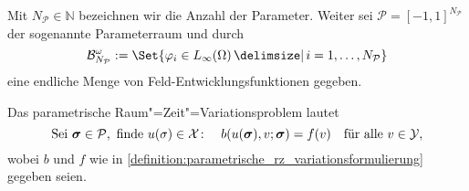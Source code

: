 \documentclass[../main.tex]{subfiles}
\begin{document}
\begin{Bemerkung}
    Mit $N_{\mathcal P} \in \mathbb{N}$ bezeichnen wir die Anzahl der Parameter.
    Weiter sei $\mathcal P = [-1, 1]^{N_{\mathcal P}}$ der sogenannte Parameterraum und durch
    \begin{equation}
        \mathcal B^{\omega}_{N_{\mathcal P}} := \Set{ \varphi_{i} \in L_{\infty}(\Omega) \given i = 1, \dots, N_{\mathcal P}}
    \end{equation}
    eine endliche Menge von Feld-Entwicklungsfunktionen gegeben.
\end{Bemerkung}

\begin{Bemerkung}
    Das parametrische Raum"=Zeit"=Variationsproblem lautet
    \begin{equation}
    \label{eq:wiederholung_variationsproblem}
        \text{Sei }\bm \sigma \in \mathcal P, \text{ finde } u(\sigma) \in \mathcal X \colon \quad b(u(\bm \sigma), v; \bm \sigma) = f(v) \quad \fa v \in \mathcal Y,
    \end{equation}
    wobei $b$ und $f$ wie in \cref{definition:parametrische_rz_variationsformulierung} gegeben seien.
\end{Bemerkung}
\end{document}
